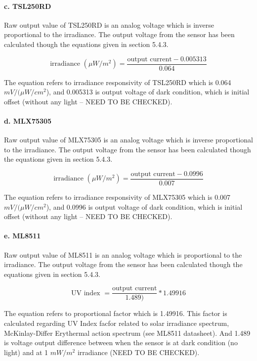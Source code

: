 \paragraph{c. TSL250RD}

Raw output value of TSL250RD is an analog voltage which is inverse proportional to the irradiance. The output voltage from the sensor has been calculated though the equations given in section 5.4.3.

{\centering
 \[ \text{irradiance } (\mu W/m^2) = \frac{\text{output current} - 0.005313}{0.064} \]
 \par
 }
 
 \bigbreak
 The equation refers to irradiance responsivity of TSL250RD which is 0.064 \(mV/(\mu W/cm^2\)), and 0.005313 is output voltage of dark condition, which is initial offset (without any light -- NEED TO BE CHECKED).

\paragraph{d. MLX75305}

Raw output value of MLX75305 is an analog voltage which is inverse proportional to the irradiance. The output voltage from the sensor has been calculated though the equations given in section 5.4.3.

{\centering
 \[ \text{irradiance } (\mu W/m^2) = \frac{\text{output current} - 0.0996}{0.007} \]
 \par
 }
 
 \bigbreak
 The equation refers to irradiance responsivity of MLX75305 which is 0.007 \(mV/(\mu W/cm^2\)), and 0.0996 is output voltage of dark condition, which is initial offset (without any light -- NEED TO BE CHECKED).

\paragraph{e. ML8511}

Raw output value of ML8511 is an analog voltage which is proportional to the irradiance. The output voltage from the sensor has been calculated though the equations given in section 5.4.3.

{\centering
 \[ \text{UV index } = \frac{\text{output current}}{1.489)} * 1.49916 \]
 \par
 }
 
 \bigbreak
 The equation refers to proportional factor which is 1.49916. This factor is calculated regarding UV Index facfor related to solar irradiance spectrum, McKinlay-Differ Erythermal action spectrum (see ML8511 datasheet). And 1.489 is voltage output difference between when the sensor is at dark condition (no light) and at 1 \(mW/m^2\) irradiance (NEED TO BE CHECKED).

